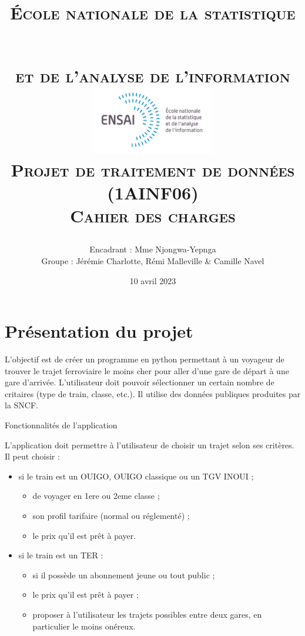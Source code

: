 \documentclass[
]{article}
\title{\LARGE\scshape École nationale de la statistique\\
\strut \\
\LARGE\scshape et de l'analyse de l'information \vspace{1cm}\\
\includegraphics[width=0.4\textwidth]{ensai_logo}\\
\vspace{1cm} \LARGE Projet de traitement de données (1AINF06)\\
\vspace{1cm} \huge Cahier des charges \vspace{3cm}}
\author{\vspace{1cm} \Large Encadrant : Mme Njongwa-Yepnga\\
\vspace{1cm} \Large Groupe : Jérémie Charlotte, Rémi Malleville \& Camille Navel \vspace{2cm}}
\date{10 avril 2023}
\providecommand{\tightlist}{%
  \setlength{\itemsep}{0pt}\setlength{\parskip}{0pt}}
\begin{document}
\maketitle

\newpage

{
\setcounter{tocdepth}{2}
\tableofcontents
}
\newpage


\hypertarget{pruxe9sentation-du-projet}{%
\section{Présentation du projet}\label{pruxe9sentation-du-projet}}

L'objectif est de créer un programme en python permettant à un voyageur de trouver le trajet ferroviaire le moins cher pour aller d'une gare de départ à une gare d'arrivée.
L'utilisateur doit pouvoir sélectionner un certain nombre de critaires (type de train, classe, etc.). Il utilise des données publiques produites par la SNCF.

Fonctionnalités de l'application

L'application doit permettre à l'utilisateur de choisir un trajet selon ses critères. Il peut choisir :

\begin{itemize}
\tightlist
\item
  si le train est un OUIGO, OUIGO classique ou un TGV INOUI ;

  \begin{itemize}
  \tightlist
  \item
    de voyager en 1ere ou 2eme classe ;
  \item
    son profil tarifaire (normal ou réglementé) ;
  \item
    le prix qu'il est prêt à payer.
  \end{itemize}
\item
  si le train est un TER :

  \begin{itemize}
  \tightlist
  \item
    si il possède un abonnement jeune ou tout public ;
  \item
    le prix qu'il est prêt à payer ;
  \item
    proposer à l'utilisateur les trajets possibles entre deux gares, en particulier le moins onéreux.
  \end{itemize}
\end{itemize}
\end{document}
